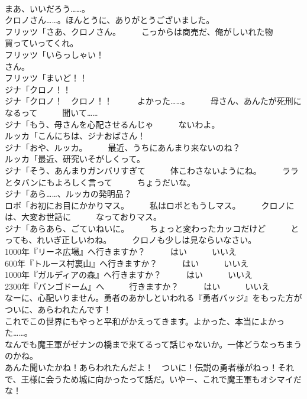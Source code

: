 \documentclass[8pt]{extreport}
\begin{document}
\begin{CJK}{UTF8}{min}
\\	まあ、いいだろう……。	
\\	クロノさん……。ほんとうに、ありがとうございました。	
\\	フリッツ「さあ、クロノさん。　　　こっからは商売だ、俺がしいれた物　　　買っていってくれ。	
\\	フリッツ「いらっしゃい！　　　
\\	さん。	
\\	フリッツ「まいど！！	
\\	ジナ「クロノ！！	
\\	ジナ「クロノ！　クロノ！！　　　よかった……。　　　母さん、あんたが死刑になるって　　　聞いて……	
\\	ジナ「もう、母さんを心配させるんじゃ　　　ないわよ。	
\\	ルッカ「こんにちは、ジナおばさん！	
\\	ジナ「おや、ルッカ。　　　最近、うちにあんまり来ないのね？	
\\	ルッカ「最近、研究いそがしくって。	
\\	ジナ「そう、あんまりガンバリすぎて　　　体こわさないようにね。　　　ララとタバンにもよろしく言って　　　ちょうだいな。	
\\	ジナ「あら……、ルッカの発明品？	
\\	ロボ「お初にお目にかかりマス。　　　私はロボともうしマス。　　　クロノには、大変お世話に　　　なっておりマス。	
\\	ジナ「あらあら、ごていねいに。　　　ちょっと変わったカッコだけど　　　とっても、れいぎ正しいわね。　　　クロノも少しは見ならいなさい。	
\\	1000年『リーネ広場』へ行きますか？　　　はい　　　いいえ	
\\	600年『トルース村裏山』へ行きますか？　　　はい　　　いいえ	
\\	1000年『ガルディアの森』へ行きますか？　　　はい　　　いいえ	
\\	2300年『バンゴドーム』へ　　　行きますか？　　　はい　　　いいえ	
\\	なーに、心配いりません。勇者のあかしといわれる『勇者バッジ』をもった方がついに、あらわれたんです！	
\\	これでこの世界にもやっと平和がかえってきます。よかった、本当によかった……。	
\\	なんでも魔王軍がゼナンの橋まで来てるって話じゃないか。一体どうなっちまうのかね。	
\\	あんた聞いたかね！あらわれたんだよ！　ついに！伝説の勇者様がねっ！それで、王様に会うため城に向かったって話だ。いやー、これで魔王軍もオシマイだな！	

\end{CJK}
\end{document}
